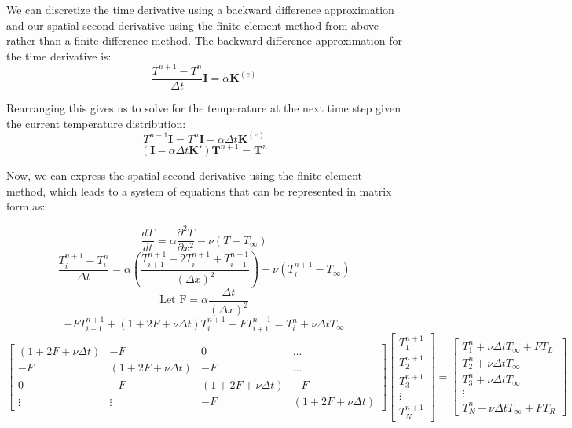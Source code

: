 \documentclass[11pt]{article}
\begin{document}
\begin{onehalfspace}
    \noindent
    We can discretize the time derivative using a backward difference approximation and our spatial second derivative using the finite element method from above rather than a finite difference method. 
    The backward difference approximation for the time derivative is:
    \[\frac{T^{n+1} - T^n}{\Delta t}\mathbf{I} = \alpha \mathbf{K}^{(e)}\]

    \noindent
    Rearranging this gives us to solve for the temperature at the next time step given the current temperature distribution:
    \[T^{n+1}\mathbf{I} = T^n\mathbf{I} + \alpha \Delta t \mathbf{K}^{(e)}\]
    \[(\mathbf{I} - \alpha \Delta t \mathbf{K}') \mathbf{T}^{n+1} = \mathbf{T}^{n}\]

    \vspace{4cm}
    \noindent
    Now, we can express the spatial second derivative using the finite element method, which leads to a
    system of equations that can be represented in matrix form as:

    \[\frac{dT}{dt} = \alpha \frac{\partial^2 T}{\partial x^2} - \nu(T - T_\infty)\]
    \[\frac{T_i^{n+1} - T_i^n}{\Delta t} = \alpha \left( \frac{T_{i+1}^{n+1} - 2T_i^{n+1} + T_{i-1}^{n+1}}{(\Delta x)^2} \right) - \nu(T_i^{n+1} - T_\infty)\]
    \[\text{Let F} = \alpha \frac{\Delta t}{(\Delta x)^2}\]
    \[-F T_{i-1}^{n+1} + (1 + 2F + \nu \Delta t) T_i^{n+1} - F T_{i+1}^{n+1} = T_i^n + \nu \Delta t T_\infty\]
    \[\begin{bmatrix} 
    (1+2F+\nu\Delta t) & -F & 0 & \dots \\
    -F & (1+2F+\nu\Delta t) & -F & \dots \\
    0 & -F & (1+2F+\nu\Delta t) & -F \\
    \vdots & \vdots & -F & (1+2F+\nu\Delta t) 
    \end{bmatrix}
    \begin{bmatrix} 
    T_1^{n+1} \\
    T_2^{n+1} \\
    T_3^{n+1} \\
    \vdots \\
    T_N^{n+1}
    \end{bmatrix}
    =
    \begin{bmatrix} 
    T_1^n + \nu \Delta t T_\infty + F T_L \\
    T_2^n + \nu \Delta t T_\infty \\
    T_3^n + \nu \Delta t T_\infty \\
    \vdots \\
    T_N^n + \nu \Delta t T_\infty + F T_R
    \end{bmatrix}\]
    

\end{onehalfspace}
\end{document}
